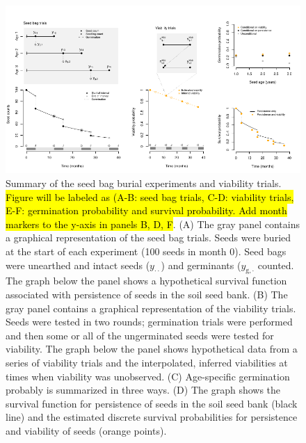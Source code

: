 \documentclass[12pt, oneside, titlepage]{article}   	%
\begin{document}
{\begin{figure}[!h]
       \includegraphics[width=\textwidth]{../manuscript/figures/seed-bag-figure.pdf}  
    \caption{ Summary of the seed bag burial experiments and viability trials. \hl{Figure will be labeled as (A-B: seed bag trials, C-D: viability trials, E-F: germination probability and survival probability. Add month markers to the y-axis in panels B, D, F}. (A) The gray panel contains a graphical representation of the seed bag trials. Seeds were buried at the start of each experiment (100 seeds in month 0). Seed bags were unearthed and intact seeds ($y_{\cdot \cdot}$) and germinants ($y_{\mathrm{g},\cdot}$ counted. The graph below the panel shows a hypothetical survival function associated with persistence of seeds in the soil seed bank. (B) The gray panel contains a graphical representation of the viability trials. Seeds were tested in two rounds; germination trials were performed and then some or all of the ungerminated seeds were tested for viability. The graph below the panel shows hypothetical data from a series of viability trials and the interpolated, inferred viabilities at times when viability was unobserved. (C) Age-specific germination probably is summarized in three ways. (D) The graph shows the survival function for persistence of seeds in the soil seed bank (black line) and the estimated discrete survival probabilities for persistence and viability of seeds (orange points). }
 \label{fig:seed-bag-experiments}
\end{figure}

\iffalse

}
\end{document}
